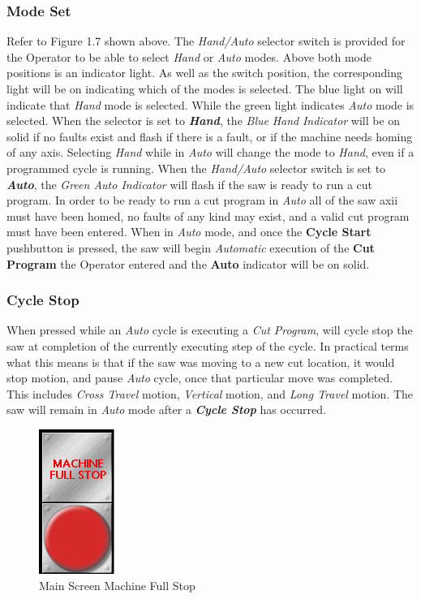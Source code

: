 \subsubsection{Mode Set} Refer to Figure 1.7 shown above. The \textit{Hand/Auto} selector switch is provided for the Operator to be able to select \textit{Hand} or \textit{Auto} modes. Above both mode positions is an indicator light. As well as the switch position, the corresponding light will be on indicating which of the modes is selected. The blue light on will indicate that \textit{Hand} mode is selected. While the green light indicates \textit{Auto} mode is selected. When the selector is set to \textbf{\textit{Hand}}, the \textit{Blue} \textit{Hand} \textit{Indicator} will be on solid if no faults exist and flash if there is a fault, or if the machine needs homing of any axis. Selecting \textit{Hand} while in \textit{Auto} will change the mode to \textit{Hand}, even if a programmed cycle is running. When the \textit{Hand/Auto} selector switch is set to \textbf{\textit{Auto}}, the \textit{Green Auto Indicator} will flash if the saw is ready to run a cut program. In order to be ready to run a cut program in \textit{Auto} all of the saw axii must have been homed, no faults of any kind may exist, and a valid cut program must have been entered. When in \textit{Auto} mode, and once the \textbf{Cycle Start} pushbutton is pressed, the saw will begin \textit{Automatic} execution of the \textbf{Cut Program} the Operator entered and the \textbf{Auto} indicator will be on solid.
\subsubsection{Cycle Stop} When pressed while an \textit{Auto} cycle is executing a \textit{Cut Program}, will cycle stop the saw at completion of the currently executing step of the cycle. In practical terms what this means is that if the saw was moving to a new cut location, it would stop motion, and pause \textit{Auto} cycle, once that particular move was completed. This includes \textit{Cross Travel} motion, \textit{Vertical} motion, and \textit{Long Travel} motion. The saw will remain in \textit{Auto} mode after a \textbf{\textit{Cycle Stop}} has occurred.
\begin{figure}
	\centering
	\includegraphics[width=.2\linewidth]{screen-captures/main/main-mach-full-stop}
	\caption{Main Screen Machine Full Stop}
	\label{fig:main-mach-full-stop}
\end{figure}

